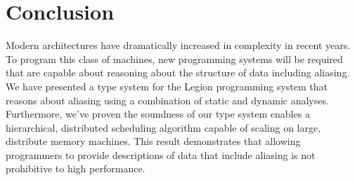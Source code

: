 
\section{Conclusion}
\label{sect:conclusion}

Modern architectures have dramatically increased in complexity in recent years.  To program this class
of machines, new programming systems will be required that are capable about reasoning about the structure
of data including aliasing.  We have presented a type system for the Legion programming system that
reasons about aliasing using a combination of static and dynamic analyses.  Furthermore, we've proven
the soundness of our type system enables a hierarchical, distributed scheduling algorithm capable
of scaling on large, distribute memory machines.  This result demonstrates that allowing programmers
to provide descriptions of data that include aliasing is not prohibitive to high performance.


